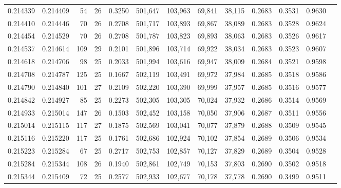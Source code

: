 \begin{tabular}{rrrrrrrrrrrrr}
0.214339 & 0.214409 &  54 &  26 &                                     0.3250 & 501,647 & 103,963 &  69,841 &  38,115 & 0.2683 & 0.3531 & 0.9630 \\
0.214410 & 0.214446 &  70 &  26 &                                     0.2708 & 501,717 & 103,893 &  69,867 &  38,089 & 0.2683 & 0.3528 & 0.9624 \\
0.214454 & 0.214529 &  70 &  26 &                                     0.2708 & 501,787 & 103,823 &  69,893 &  38,063 & 0.2683 & 0.3526 & 0.9617 \\
0.214537 & 0.214614 & 109 &  29 &                                     0.2101 & 501,896 & 103,714 &  69,922 &  38,034 & 0.2683 & 0.3523 & 0.9607 \\
0.214618 & 0.214706 &  98 &  25 &                                     0.2033 & 501,994 & 103,616 &  69,947 &  38,009 & 0.2684 & 0.3521 & 0.9598 \\
0.214708 & 0.214787 & 125 &  25 &                                     0.1667 & 502,119 & 103,491 &  69,972 &  37,984 & 0.2685 & 0.3518 & 0.9586 \\
0.214790 & 0.214840 & 101 &  27 &                                     0.2109 & 502,220 & 103,390 &  69,999 &  37,957 & 0.2685 & 0.3516 & 0.9577 \\
0.214842 & 0.214927 &  85 &  25 &                                     0.2273 & 502,305 & 103,305 &  70,024 &  37,932 & 0.2686 & 0.3514 & 0.9569 \\
0.214933 & 0.215014 & 147 &  26 &                                     0.1503 & 502,452 & 103,158 &  70,050 &  37,906 & 0.2687 & 0.3511 & 0.9556 \\
0.215014 & 0.215115 & 117 &  27 &                                     0.1875 & 502,569 & 103,041 &  70,077 &  37,879 & 0.2688 & 0.3509 & 0.9545 \\
0.215116 & 0.215220 & 117 &  25 &                                     0.1761 & 502,686 & 102,924 &  70,102 &  37,854 & 0.2689 & 0.3506 & 0.9534 \\
0.215223 & 0.215284 &  67 &  25 &                                     0.2717 & 502,753 & 102,857 &  70,127 &  37,829 & 0.2689 & 0.3504 & 0.9528 \\
0.215284 & 0.215344 & 108 &  26 &                                     0.1940 & 502,861 & 102,749 &  70,153 &  37,803 & 0.2690 & 0.3502 & 0.9518 \\
0.215344 & 0.215409 &  72 &  25 &                                     0.2577 & 502,933 & 102,677 &  70,178 &  37,778 & 0.2690 & 0.3499 & 0.9511 \\

\end{tabular}
